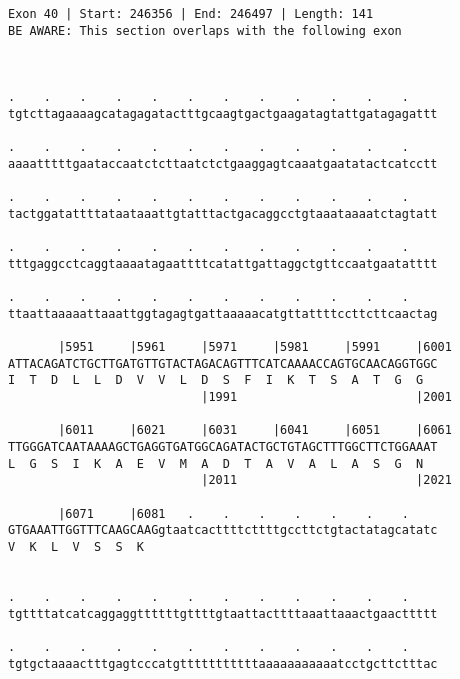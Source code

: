 \documentclass{article}
\begin{document}
\begin{Verbatim}
Exon 40 | Start: 246356 | End: 246497 | Length: 141
BE AWARE: This section overlaps with the following exon



.    .    .    .    .    .    .    .    .    .    .    .    
tgtcttagaaaagcatagagatactttgcaagtgactgaagatagtattgatagagattt
                                                            
.    .    .    .    .    .    .    .    .    .    .    .    
aaaatttttgaataccaatctcttaatctctgaaggagtcaaatgaatatactcatcctt
                                                            
.    .    .    .    .    .    .    .    .    .    .    .    
tactggatattttataataaattgtatttactgacaggcctgtaaataaaatctagtatt
                                                            
.    .    .    .    .    .    .    .    .    .    .    .    
tttgaggcctcaggtaaaatagaattttcatattgattaggctgttccaatgaatatttt
                                                            
.    .    .    .    .    .    .    .    .    .    .    .    
ttaattaaaaattaaattggtagagtgattaaaaacatgttattttccttcttcaactag
                                                            
       |5951     |5961     |5971     |5981     |5991     |6001
ATTACAGATCTGCTTGATGTTGTACTAGACAGTTTCATCAAAACCAGTGCAACAGGTGGC
I  T  D  L  L  D  V  V  L  D  S  F  I  K  T  S  A  T  G  G  
                           |1991                         |2001
  
       |6011     |6021     |6031     |6041     |6051     |6061
TTGGGATCAATAAAAGCTGAGGTGATGGCAGATACTGCTGTAGCTTTGGCTTCTGGAAAT
L  G  S  I  K  A  E  V  M  A  D  T  A  V  A  L  A  S  G  N  
                           |2011                         |2021
  
       |6071     |6081   .    .    .    .    .    .    .    
GTGAAATTGGTTTCAAGCAAGgtaatcacttttcttttgccttctgtactatagcatatc
V  K  L  V  S  S  K                                         
                                                            
  
.    .    .    .    .    .    .    .    .    .    .    .    
tgttttatcatcaggaggttttttgttttgtaattacttttaaattaaactgaacttttt
                                                            
.    .    .    .    .    .    .    .    .    .    .    .    
tgtgctaaaactttgagtcccatgtttttttttttaaaaaaaaaaatcctgcttctttac
                                                            

\end{Verbatim}
\end{document}
